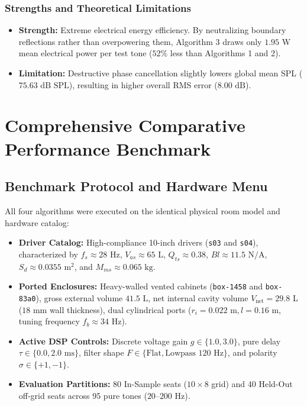 \documentclass[11pt,a4paper,titlepage]{article}
\begin{document}
\subsubsection{Strengths and Theoretical Limitations}
\begin{itemize}
    \item \textbf{Strength:} Extreme electrical energy efficiency. By neutralizing boundary reflections rather than overpowering them, Algorithm 3 draws only $1.95\text{ W}$ mean electrical power per test tone ($52\%$ less than Algorithms 1 and 2).
    \item \textbf{Limitation:} Destructive phase cancellation slightly lowers global mean SPL ($75.63\text{ dB SPL}$), resulting in higher overall RMS error ($8.00\text{ dB}$).
\end{itemize}

\newpage

\section{Comprehensive Comparative Performance Benchmark}

\subsection{Benchmark Protocol and Hardware Menu}
All four algorithms were executed on the identical physical room model and hardware catalog:
\begin{itemize}
    \item \textbf{Driver Catalog:} High-compliance 10-inch drivers (\texttt{s03} and \texttt{s04}), characterized by $f_s \approx 28\text{ Hz}$, $V_{as} \approx 65\text{ L}$, $Q_{ts} \approx 0.38$, $B l \approx 11.5\text{ N/A}$, $S_d \approx 0.0355\text{ m}^2$, and $M_{ms} \approx 0.065\text{ kg}$.
    \item \textbf{Ported Enclosures:} Heavy-walled vented cabinets (\texttt{box-1458} and \texttt{box-83a0}), gross external volume $41.5\text{ L}$, net internal cavity volume $V_{\text{net}} = 29.8\text{ L}$ ($18\text{ mm}$ wall thickness), dual cylindrical ports ($r_i = 0.022\text{ m}, l = 0.16\text{ m}$, tuning frequency $f_b \approx 34\text{ Hz}$).
    \item \textbf{Active DSP Controls:} Discrete voltage gain $g \in \{1.0, 3.0\}$, pure delay $\tau \in \{0.0, 2.0\text{ ms}\}$, filter shape $F \in \{\text{Flat}, \text{Lowpass } 120\text{ Hz}\}$, and polarity $\sigma \in \{+1, -1\}$.
    \item \textbf{Evaluation Partitions:} 80 In-Sample seats ($10 \times 8$ grid) and 40 Held-Out off-grid seats across 95 pure tones ($20\text{--}200\text{ Hz}$).
\end{itemize}
\end{document}
